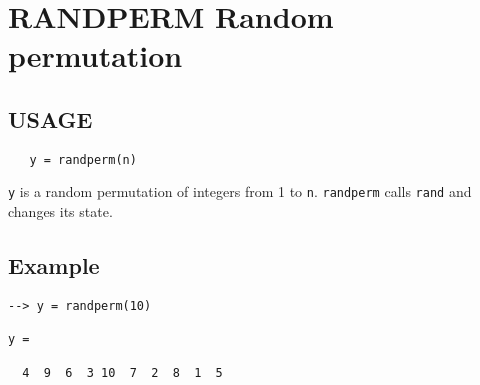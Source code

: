 \section{RANDPERM Random permutation}

\subsection{USAGE}

\begin{verbatim}
   y = randperm(n)
\end{verbatim}
\verb|y| is a random permutation of integers from 1 to \verb|n|.
\verb|randperm| calls \verb|rand| and changes its state.
\subsection{Example}

\begin{verbatim}
--> y = randperm(10)

y = 

  4  9  6  3 10  7  2  8  1  5 
\end{verbatim}
